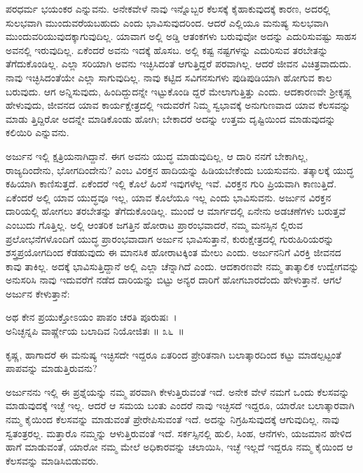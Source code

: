 ಪರಧರ್ಮ ಭಯಂಕರ ಎನ್ನುವನು. ಅನೇಕವೇಳೆ ನಾವು ಇನ್ನೊಬ್ಬರ ಕೆಲಸಕ್ಕೆ ಕೈಹಾಕುವುದಕ್ಕೆ ಕಾರಣ, ಅದರಲ್ಲಿ ಸುಲಭವಾಗಿ ಮುಂದುವರೆಯಬಹುದು ಎಂದು ಭಾವಿಸುವುದರಿಂದ. ಆದರೆ ಎಲ್ಲಿಯೂ ಮನುಷ್ಯ ಸುಲಭವಾಗಿ ಮುಂದುವರಿಯುವುದಕ್ಕಾಗುವುದಿಲ್ಲ. ಯಾವಾಗ ಅಲ್ಲಿ ಅಡ್ಡಿ ಆತಂಕಗಳು ಬರುವುವೋ ಅದನ್ನು ಎದುರಿಸುವಷ್ಟು ಸಾಹಸ ಅವನಲ್ಲಿ ಇರುವುದಿಲ್ಲ. ಏಕೆಂದರೆ ಅವನು ಇದಕ್ಕೆ ಹೊಸಬ. ಅಲ್ಲಿ ಕಷ್ಟ ನಷ್ಟಗಳನ್ನು ಎದುರಿಸುವ ತರಬೇತನ್ನು ತೆಗೆದುಕೊಂಡಿಲ್ಲ. ಎಲ್ಲಾ ಸರಿಯಾಗಿ ಅವನು ಇಚ್ಛಿಸಿದಂತೆ ಆಗುತ್ತಿದ್ದರೆ ಪರವಾಗಿಲ್ಲ. ಆದರೆ ಜೀವನ ವಿಚಿತ್ರವಾದುದು. ನಾವು ಇಚ್ಛಿಸಿದಂತೆಯೇ ಎಲ್ಲಾ ಸಾಗುವುದಿಲ್ಲ. ನಾವು ಕಟ್ಟಿದ ಸವಿಗನಸುಗಳು ಪುಡಿಪುಡಿಯಾಗಿ ಹೋಗುವ ಕಾಲ ಬರುವುದು. ಆಗ ಅನ್ನಿಸುವುದು, ಹಿಂದಿದ್ದುದನ್ನೇ ಇಟ್ಟುಕೊಂಡಿ ದ್ದರೆ ಮೇಲಾಗುತ್ತಿತ್ತು ಎಂದು. ಆದಕಾರಣವೇ ಶ‍್ರೀಕೃಷ್ಣ ಹೇಳುವುದು, ಜೀವನದ ಯಾವ ಕಾರ್ಯಕ್ಷೇತ್ರದಲ್ಲಿ ಇದುವರೆಗೆ ನಿಮ್ಮ ಸ್ವಭಾವಕ್ಕೆ ಅನುಗುಣವಾದ ಯಾವ ಕೆಲಸವನ್ನು ಮಾಡು ತ್ತಿದ್ದಿರೋ ಅದನ್ನೇ ಮಾಡಿಕೊಂಡು ಹೋಗಿ; ಬೇಕಾದರೆ ಅದನ್ನು ಉತ್ತಮ ದೃಷ್ಟಿಯಿಂದ ಮಾಡುವುದನ್ನು ಕಲಿಯಿರಿ ಎನ್ನುವನು.

ಅರ್ಜುನ ಇಲ್ಲಿ ಕ್ಷತ್ರಿಯನಾಗಿದ್ದಾನೆ. ಈಗ ಅವನು ಯುದ್ಧ ಮಾಡುವುದಿಲ್ಲ, ಆ ದಾರಿ ನನಗೆ ಬೇಕಾಗಿಲ್ಲ, ರಾಜ್ಯದಿಂದೇನು, ಭೋಗದಿಂದೇನು? ಎಂಬ ವಿರಕ್ತನ ಹಾದಿಯನ್ನು ಹಿಡಿಯಬೇಕೆಂದು ಬಯಸುವನು. ತತ್ಕಾಲಕ್ಕೆ ಯುದ್ಧ ಕಹಿಯಾಗಿ ಕಾಣಿಸುತ್ತದೆ. ಏಕೆಂದರೆ ಇಲ್ಲಿ ಕೊಲೆ ಹಿಂಸೆ ಇವುಗಳೆಲ್ಲ ಇವೆ. ವಿರಕ್ತನ ಗುರಿ ಪ್ರಿಯವಾಗಿ ಕಾಣುತ್ತಿದೆ. ಏಕೆಂದರೆ ಅಲ್ಲಿ ಯಾವ ಯುದ್ಧವೂ ಇಲ್ಲ, ಯಾವ ಕೊಲೆಯೂ ಇಲ್ಲ ಎಂದು ಭಾವಿಸುವನು. ಅರ್ಜುನ ವಿರಕ್ತನ ದಾರಿಯಲ್ಲಿ ಹೋಗಲು ತರಬೇತನ್ನು ತೆಗೆದುಕೊಂಡಿಲ್ಲ. ಮುಂದೆ ಆ ಮಾರ್ಗದಲ್ಲಿ ಏನೇನು ಅಡಚಣೆಗಳು ಬರುತ್ತವೆ ಎಂಬುದು ಗೊತ್ತಿಲ್ಲ. ಅಲ್ಲಿ ಆಂತರಿಕ ಜಗತ್ತಿನ ಹೋರಾಟ ಪ್ರಾರಂಭವಾದರೆ, ನಮ್ಮ ಮನಸ್ಸಿನ ಲ್ಲಿರುವ ಪ್ರಲೋಭನೆಗಳೊಂದಿಗೆ ಯುದ್ಧ ಪ್ರಾರಂಭವಾದಾಗ ಅರ್ಜುನ ಭಾವಿಸುತ್ತಾನೆ, ಕುರುಕ್ಷೇತ್ರದಲ್ಲಿ ಗುರುಹಿರಿಯರನ್ನು ಶಸ್ತ್ರಪ್ರಯೋಗದಿಂದ ಕೆಡಹುವುದು ಈ ಮಾನಸಿಕ ಹೋರಾಟಕ್ಕಿಂತ ಮೇಲು ಎಂದು. ಅರ್ಜುನನಿಗೆ ವಿರಕ್ತಿ ಜೀವನದ ಕಾವು ತಾಕಿಲ್ಲ. ಅದಕ್ಕೆ ಭಾವಿಸುತ್ತಿದ್ದಾನೆ ಅಲ್ಲಿ ಎಲ್ಲಾ ಚೆನ್ನಾಗಿದೆ ಎಂದು. ಆದಕಾರಣವೇ ನಮ್ಮ ತಾತ್ಕಾಲಿಕ ಉದ್ವೇಗವನ್ನು ಅನುಸರಿಸಿ ನಾವು ಇದುವರೆಗೆ ನಡೆದ ದಾರಿಯನ್ನು ಬಿಟ್ಟು ಅನ್ಯರ ದಾರಿಗೆ ಹೋಗಬಾರದೆಂದು ಹೇಳುತ್ತಾನೆ. ಆಗಲೆ ಅರ್ಜುನ ಕೇಳುತ್ತಾನೆ:

\begin{shloka}
ಅಥ ಕೇನ ಪ್ರಯುಕ್ತೋಽಯಂ ಪಾಪಂ ಚರತಿ ಪೂರುಷಃ~।\\ಅನಿಚ್ಛನ್ನಪಿ ವಾರ್ಷ್ಣೇಯ ಬಲಾದಿವ ನಿಯೋಜಿತಃ \hfill॥ ೩೬~॥
\end{shloka}

\begin{artha}
ಕೃಷ್ಣ, ಹಾಗಾದರೆ ಈ ಮನುಷ್ಯ ಇಚ್ಛಿಸದೇ ಇದ್ದರೂ ಏತರಿಂದ ಪ್ರೇರಿತನಾಗಿ ಬಲಾತ್ಕಾರದಿಂದ ಕಟ್ಟು ಮಾಡಲ್ಪಟ್ಟಂತೆ ಪಾಪವನ್ನು ಮಾಡುತ್ತಿರುವನು?
\end{artha}

ಅರ್ಜುನನು ಇಲ್ಲಿ ಈ ಪ್ರಶ್ನೆಯನ್ನು ನಮ್ಮ ಪರವಾಗಿ ಕೇಳುತ್ತಿರುವಂತೆ ಇದೆ. ಅನೇಕ ವೇಳೆ ನಮಗೆ ಒಂದು ಕೆಲಸವನ್ನು ಮಾಡುವುದಕ್ಕೆ ಇಚ್ಛೆ ಇಲ್ಲ. ಆದರೆ ಆ ಸಮಯ ಬಂತು ಎಂದರೆ ನಾವು ಇಚ್ಛಿಸದೆ ಇದ್ದರೂ, ಯಾರೋ ಬಲಾತ್ಕಾರವಾಗಿ ನಮ್ಮ ಕೈಯಿಂದ ಕೆಲಸವನ್ನು ಮಾಡುವಂತೆ ಪ್ರೇರೇಪಿಸುವಂತೆ ಇದೆ. ಅದನ್ನು ನಿಗ್ರಹಿಸುವುದಕ್ಕೆ ಆಗುವುದಿಲ್ಲ. ನಾವು ಸ್ವತಂತ್ರರಲ್ಲ. ಮತ್ತಾರೊ ನಮ್ಮನ್ನು ಆಳುತ್ತಿರುವಂತೆ ಇದೆ. ಸರ್ಕಸ್ಸಿನಲ್ಲಿ ಹುಲಿ, ಸಿಂಹ, ಆನೆಗಳು, ಯಜಮಾನ ಹೇಳಿದ ಹಾಗೆ ಮಾಡುವಂತೆ, ಯಾರೋ ನಮ್ಮ ಮೇಲೆ ಅಧಿಕಾರವನ್ನು ಚಲಾಯಿಸಿ, ಇಚ್ಛೆ ಇಲ್ಲದೆ ಇದ್ದರೂ ನಮ್ಮ ಕೈಯಿಂದ ಆ ಕೆಲಸವನ್ನು ಮಾಡಿಸಿಬಿಡುವರು.

